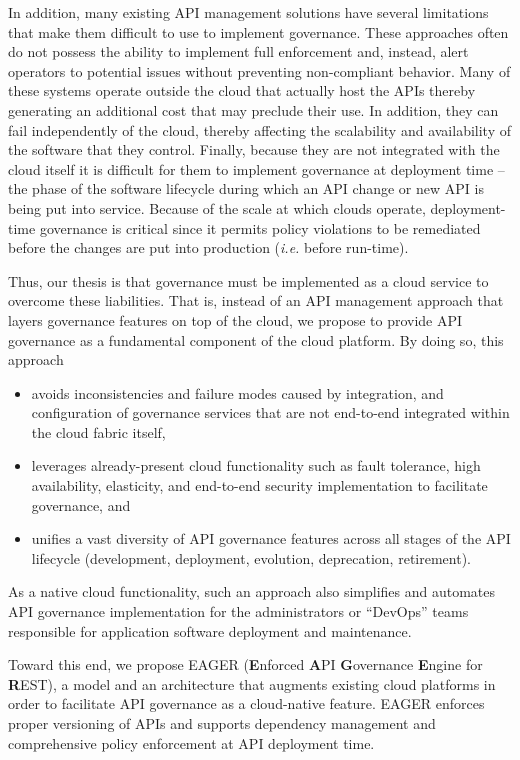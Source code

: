 In addition, many existing
API management solutions have several limitations that make them difficult to
use to implement governance.  
These approaches often 
do not possess the ability to implement full enforcement and, instead, alert
operators to potential issues without preventing non-compliant behavior.
Many of these systems operate outside the 
cloud that actually host the APIs thereby generating an additional cost that
may preclude their use.
In addition, they can fail independently of the cloud, thereby affecting 
the scalability and availability of the software that they control.
Finally, because they are not integrated with the cloud itself it is difficult
for them to
implement governance at deployment time -- the phase of the software lifecycle
during which an API change or new API is being put into service.
Because of the scale at which clouds operate, deployment-time governance is
critical since it permits policy violations to be remediated before the
changes are put into production ({\em i.e.} before run-time).

Thus, our thesis is that governance must be implemented as a cloud service to
overcome these liabilities.
That is, instead of an API management
approach that layers governance features on top of the cloud, 
we propose to provide API governance as a fundamental component of the cloud
platform.  By doing so, this approach
\begin{itemize}
\item avoids inconsistencies and failure modes caused  
by integration, and configuration of governance services that are not
end-to-end integrated within the cloud fabric itself, 
\item leverages already-present cloud functionality such as fault tolerance,
high availability, elasticity, and end-to-end security implementation to
facilitate governance, and
\item unifies a vast diversity of API
governance features across all stages of the API lifecycle
(development, deployment, evolution, deprecation, retirement). 
\end{itemize}
As a native cloud functionality, such an
approach also simplifies and automates API governance implementation for
the administrators or ``DevOps'' teams responsible for application
software deployment and
maintenance.

Toward this end, we propose EAGER ({\bf E}nforced {\bf A}PI {\bf G}overnance
{\bf E}ngine for {\bf R}EST), a model and an architecture that augments existing
cloud platforms in order to facilitate API governance as a 
cloud-native feature. EAGER enforces proper versioning of APIs and supports dependency 
management and comprehensive policy enforcement at API deployment time. 

